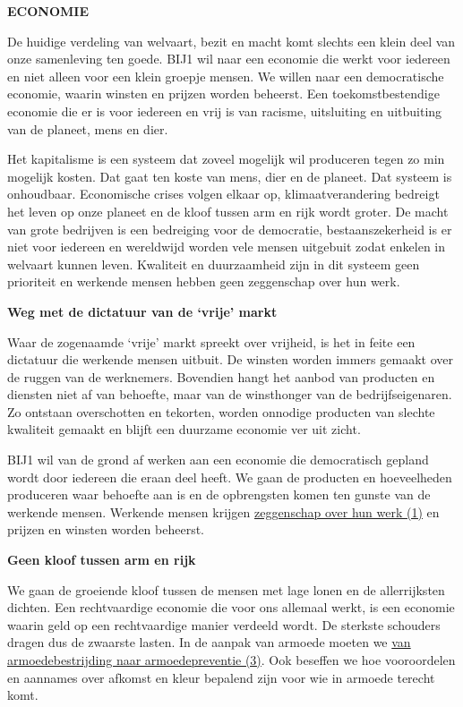 \textbf{ECONOMIE}

De huidige verdeling van welvaart, bezit en macht komt slechts een klein
deel van onze samenleving ten goede. BIJ1 wil naar een economie die
werkt voor iedereen en niet alleen voor een klein groepje mensen. We
willen naar een democratische economie, waarin winsten en prijzen worden
beheerst. Een toekomstbestendige economie die er is voor iedereen en
vrij is van racisme, uitsluiting en uitbuiting van de planeet, mens en
dier.

Het kapitalisme is een systeem dat zoveel mogelijk wil produceren tegen
zo min mogelijk kosten. Dat gaat ten koste van mens, dier en de planeet.
Dat systeem is onhoudbaar. Economische crises volgen elkaar op,
klimaatverandering bedreigt het leven op onze planeet en de kloof tussen
arm en rijk wordt groter. De macht van grote bedrijven is een bedreiging
voor de democratie, bestaanszekerheid is er niet voor iedereen en
wereldwijd worden vele mensen uitgebuit zodat enkelen in welvaart kunnen
leven. Kwaliteit en duurzaamheid zijn in dit systeem geen prioriteit en
werkende mensen hebben geen zeggenschap over hun werk.

\textbf{Weg met de dictatuur van de `vrije' markt}

Waar de zogenaamde `vrije' markt spreekt over vrijheid, is het in feite
een dictatuur die werkende mensen uitbuit. De winsten worden immers
gemaakt over de ruggen van de werknemers. Bovendien hangt het aanbod van
producten en diensten niet af van behoefte, maar van de winsthonger van
de bedrijfseigenaren. Zo ontstaan overschotten en tekorten, worden
onnodige producten van slechte kwaliteit gemaakt en blijft een duurzame
economie ver uit zicht.

BIJ1 wil van de grond af werken aan een economie die democratisch
gepland wordt door iedereen die eraan deel heeft. We gaan de producten
en hoeveelheden produceren waar behoefte aan is en de opbrengsten komen
ten gunste van de werkende mensen. Werkende mensen krijgen
\underline{zeggenschap over hun werk (1)} en prijzen en winsten worden
beheerst.

\textbf{Geen kloof tussen arm en rijk}

We gaan de groeiende kloof tussen de mensen met lage lonen en de
allerrijksten dichten. Een rechtvaardige economie die voor ons allemaal
werkt, is een economie waarin geld op een rechtvaardige manier verdeeld
wordt. De sterkste schouders dragen dus de zwaarste lasten. In de aanpak
van armoede moeten we \underline{van armoedebestrijding naar
armoedepreventie (3)}. Ook beseffen we hoe vooroordelen en aannames over
afkomst en kleur bepalend zijn voor wie in armoede terecht komt.


